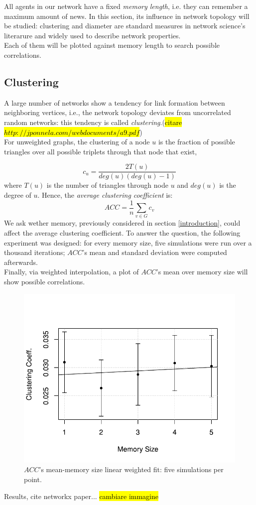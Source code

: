 All agents in our network have a fixed \textit{memory length}, i.e. they can remember a maximum
 amount of news.
In this section, its influence in network topology will be studied: clustering and
 diameter are standard measures in network science's literarure and widely used to describe 
 network properties.\\
  Each of them will be plotted 
 against memory length to search possible correlations.
\subsection{Clustering} \label{clustering}
A large number of networks show a tendency for link formation between neighboring vertices, 
i.e., the network topology deviates from uncorrelated random networks: this tendency is called 
\textit{clustering}.(\hl{citare $http://jponnela.com/webdocuments/a9.pdf$}) \\
For unweighted graphs, the clustering of a node $u$ is the fraction of possible triangles over 
all possible triplets  through that node that exist,

\begin{equation}
\label{eq:clustering}
c_u = \frac{2 T(u)}{deg(u)(deg(u)-1)}
\end{equation}
where $T(u)$ is the number of triangles through node $u$ and $deg(u)$ is the degree of $u$.
Hence, the \textit{average clustering coefficient}  is:
\begin{equation}
\label{eq:average_clustering}
ACC = \frac{1}{n}\sum_{v \in G} c_v
\end{equation}
We ask wether memory, previously considered in section \ref{introduction}, could affect the 
average clustering coefficient.
To answer the question, the following experiment was designed:
for every memory size, five simulations were run over a thousand iterations; $ACC$'s mean and 
standard deviation were computed afterwards.\\
Finally, via weighted interpolation, a plot of $ACC$'s mean over memory size will show possible
 correlations.
\begin{figure}[h]
  \centering
  \includegraphics[trim={0cm 0cm 0cm 1cm},clip,width=.8\columnwidth]{img/clustering.pdf}
  \caption{$ACC$'s mean-memory size linear weighted fit: five simulations per point.}
  \label{fig:clustering}
\end{figure}
Results, cite networkx paper...
\hl{cambiare immagine}